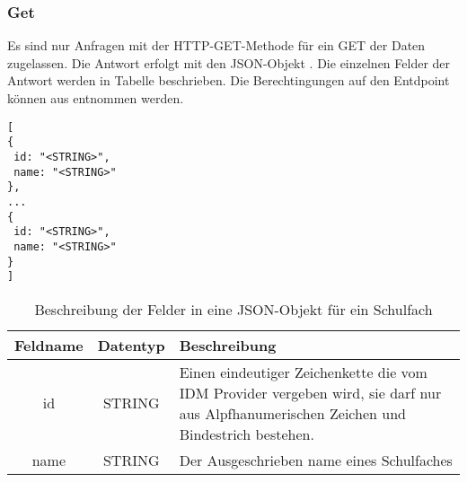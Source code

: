 \subsubsection{Get}
\label{sec:end:rest:api:school-subjects:get}
Es sind nur Anfragen mit der HTTP-GET-Methode für ein GET der Daten zugelassen.
Die Antwort erfolgt mit den JSON-Objekt . Die einzelnen Felder der Antwort werden in Tabelle  beschrieben.
Die Berechtingungen auf den Entdpoint können aus  entnommen werden.

\begin{lstlisting}[caption={JSON-Antwort für einen GET-Aufruf der Route /api/school-subjects},label={lst:code:end:rest:api:school-subjects:get:ret},frame=tlrb]
[
{
 id: "<STRING>",
 name: "<STRING>"
},
...
{
 id: "<STRING>",
 name: "<STRING>"
}
]
\end{lstlisting}
\begin{table}[!htb]
	\begin{tabularx}{\textwidth}{|c|c|X|}
		\hline
			\textbf{Feldname} & \textbf{Datentyp} & \textbf{Beschreibung} \\ \hline
			id & STRING & Einen eindeutiger Zeichenkette die vom IDM Provider vergeben wird, sie darf nur aus Alpfhanumerischen Zeichen und Bindestrich bestehen.\\ \hline
			name & STRING & Der Ausgeschrieben name eines Schulfaches \\ \hline
	\end{tabularx}

		\caption{Beschreibung der Felder in eine JSON-Objekt für ein Schulfach}
		\label{tab:end:rest:api:school-subjects:get:ret:json}
\end{table}
